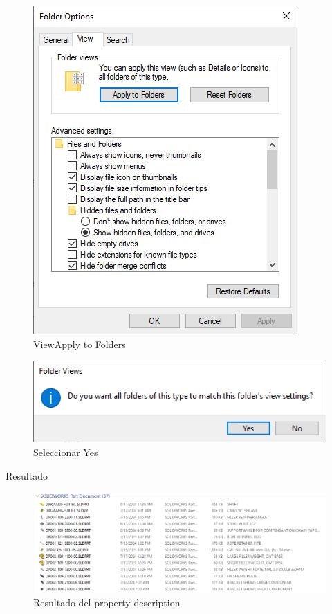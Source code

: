 \documentclass{report}
\begin{document}
\begin{figure}[H]
	\centering
	\includegraphics[width=0.85\linewidth, height=0.5\textheight,keepaspectratio]{Imagenes/fe_prop_desc_04}
	\caption{View\textrightarrow Apply to Folders}
	\label{fig:fepropdesc04}
\end{figure}

\begin{figure}[H]
	\centering
	\includegraphics[width=0.85\linewidth, height=0.5\textheight,keepaspectratio]{Imagenes/fe_prop_desc_05}
	\caption{Seleccionar Yes}
	\label{fig:fepropdesc05}
\end{figure}

\clearpage

{\LARGE Resultado}

\begin{figure}[H]
	\centering
	\includegraphics[width=0.95\linewidth, height=0.5\textheight,keepaspectratio]{Imagenes/fe_prop_desc_06}
	\caption{Resultado del property description}
	\label{fig:fepropdesc06}
\end{figure}
\end{document}

